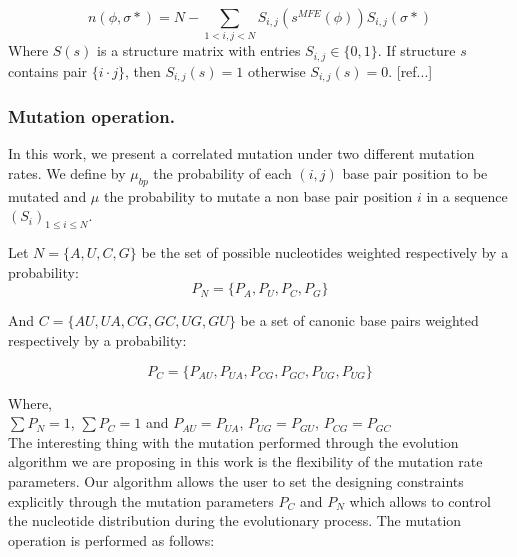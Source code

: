 \documentclass[english,12pt,a4paper]{article}
\theoremstyle{definition}
\begin{document}
\begin{itemize}
	$$ 
	n(\phi, \sigma*) = N - \sum_{1<i,j<N} S_{i,j}(s^{MFE}(\phi))S_{i,j}(\sigma*)
	$$
	Where $S(s)$ is a structure matrix with entries $S_{i,j} \in \big \{ 0, 1\big \}$. If structure $s$ contains pair $\{i \cdot j\}$, then $S_{i,j}(s) = 1$ otherwise $S_{i,j}(s) = 0$. [ref...]

	
	
	
%	
	
	
\end{itemize}

\subsubsection{Mutation operation.}
In this work, we present a correlated mutation under two different mutation rates. We define by $\mu_{bp}$ the probability of each $(i,j)$ base pair position to be mutated and $\mu$ the probability to mutate a non base pair position $i$ in a sequence $(S_i)_{1\leq i \leq N}$.   

Let $ N = \big \{ A, U, C, G \big \} $ be the set of possible nucleotides weighted respectively by a probability:  $$ 
P_N = \big \{ P_A, P_U, P_C, P_G \big\}
$$

 And $C = \big \{  AU, UA, CG, GC, UG, GU\big \}$ be a set of canonic base pairs weighted respectively by a probability:
 
 $$
 P_C = \big \{P_{AU}, P_{UA},P_{CG},P_{GC},P_{UG},P_{UG} \big \} 
 $$
 
 Where, \\
 
  $\sum P_N = 1$, $\sum P_C  = 1$ and $P_{AU} = P_{UA}$, $P_{UG} =P_{GU}$, $P_{CG} = P_{GC}$\\  

The interesting thing with the mutation performed through the evolution algorithm we are proposing in this work is the flexibility of the mutation rate parameters. Our algorithm allows the user to set the designing constraints explicitly through the mutation parameters $P_C$ and $P_N$ which allows to control the nucleotide distribution during the evolutionary process. 
The mutation operation is performed as follows: 
\end{document}
